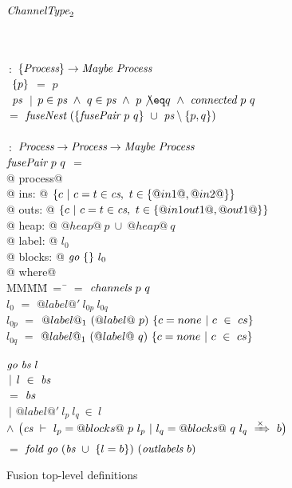 \begin{figure}

\begin{tabbing}
$\textit{ChannelType}_2$   \TABDEF \kill

 \\
\\
 \> $~:$ \> $\{ \textit{Process} \} \to  \textit{Maybe}~\textit{Process}$ \\
~$\{ p \}$ \> $=$ \> $p$ \\
~$\textit{ps}$
    \> $~|$      \> $p \in \ti{ps} ~\wedge~ q \in \ti{ps} ~\wedge~ p \not\eq q ~\wedge~ \ti{connected}~p~q$ \\
    \> $=$ \> $\textit{fuseNest}~(\{ \textit{fusePair}~p~q \}~\cup~\textit{ps} \setminus \{ p,q \})$ \\
\\
 \> $~:$ \> $\textit{Process} \to \textit{Process} \to  \textit{Maybe}~\textit{Process}$ \\
$\textit{fusePair}~p~q$ \> $=$ \\
@    process@ \\
@        ins: @ $\{ c~|~c=t \in \textit{cs},~t \in \{ @in1@,@in2@ \} \} $ \\
@       outs: @ $\{ c~|~c=t \in \textit{cs},~t \in \{ @in1out1@,@out1@ \} \} $ \\
@       heap: @ $@heap@~p~\cup~@heap@~q$ \\
@      label: @ $l_0$ \\
@     blocks: @ $\textit{go}~\{  \}~l_0$ \\
@ where@ \\
MM\=MM\=~=~\=\kill
 \> \cs \> $=$ \> $\textit{channels}~p~q$ \\
 \> $l_0$   \> $=$ \> $@label@'~l_{0p}~l_{0q}$ \\
 \> $l_{0p}$   \> $=$ \> $@label@_1~(@label@~p)~\{ c=none~|~c~\in~cs \}$ \\
 \> $l_{0q}$   \> $=$ \> $@label@_1~(@label@~q)~\{ c=none~|~c~\in~cs \}$ \\
 \\
 \> $\textit{go}~\textit{bs}~l$ \\
 \> \> $~|$ \> $l~\in~\textit{bs}$ \\
 \> \> $=$  \> $\textit{bs}$ \\
 \> \> $~|$     \> $@label@'~l_p~l_q~\in~l$ \\
 \> \> $\wedge$ \>
        $\big(\textit{cs}~\vdash~l_p=@blocks@~p~l_p~|~l_q=@blocks@~q~l_q~\xRightarrow{\times}~b\big)$ \\ 
 \> \> $=$ \> $\textit{fold}~\textit{go}~(\textit{bs}~\cup~\{ l=b \})~(\textit{outlabels}~b)$ \\
\end{tabbing}
\caption{Fusion top-level definitions}
\label{fig:Fusion:Def:Top}
\end{figure}




